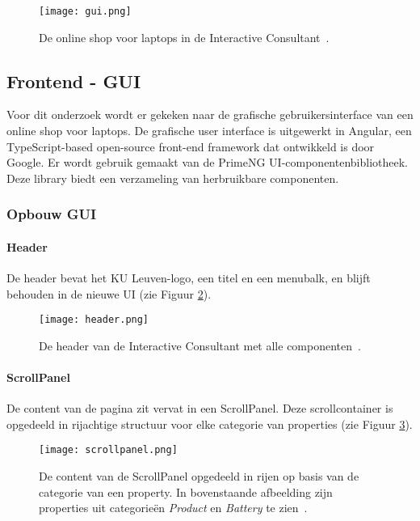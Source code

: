\begin{figure}
    \centering
    \texttt{[image: gui.png]}
    \caption[Huidige gebruikersinterface.]{\label{fig:gui}De online shop voor laptops in de Interactive Consultant~\autocite{KULeuven}.}
\end{figure}

\subsection{Frontend - GUI}
Voor dit onderzoek wordt er gekeken naar de grafische gebruikersinterface van een online shop voor laptops. De grafische user interface is uitgewerkt in Angular, een TypeScript-based open-source front-end framework dat ontwikkeld is door Google. Er wordt gebruik gemaakt van de PrimeNG UI-componentenbibliotheek. Deze library biedt een verzameling van herbruikbare componenten.

\subsubsection{Opbouw GUI}
\paragraph{Header}
De header bevat het KU Leuven-logo, een titel en een menubalk, en blijft behouden in de nieuwe UI (zie Figuur \ref{fig:header}).

\begin{figure}
  \centering
  \texttt{[image: header.png]}
  \caption[Header huidige en nieuwe UI.]{\label{fig:header}De header van de Interactive Consultant met alle componenten~\autocite{KULeuven}.}
\end{figure}

\paragraph{ScrollPanel}
De content van de pagina zit vervat in een ScrollPanel. Deze scrollcontainer is opgedeeld in rijachtige structuur voor elke categorie van properties (zie Figuur \ref{fig:scrollpanel}).

\begin{figure}
    \centering
    \texttt{[image: scrollpanel.png]}
    \caption[ScrollPanel van huidige UI]{\label{fig:scrollpanel}De content van de ScrollPanel opgedeeld in rijen op basis van de categorie van een property. In bovenstaande afbeelding zijn properties uit categorieën \textit{Product} en \textit{Battery} te zien~\autocite{KULeuven}.}
\end{figure}

